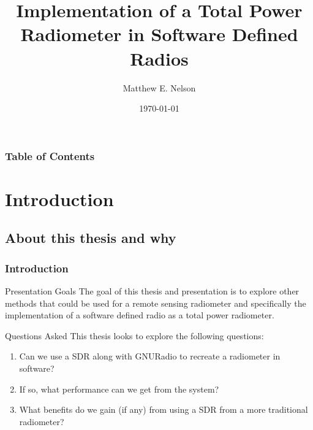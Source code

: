 \documentclass{beamer}
\title[SDR Radiometer]{Implementation of a Total Power Radiometer in Software Defined Radios}
\author{Matthew E. Nelson}
\institute[ISU] 
{
Iowa State University \\ 
\medskip
\textit{mnelson@iastate.edu} %
}
\date{\today}
\begin{document}
\begin{frame}
\titlepage 
\end{frame}

\begin{frame}[allowframebreaks]
\frametitle{Table of Contents} 
\begin{multicols}{2}
\tableofcontents[hideallsubsections]
\end{multicols}
\end{frame}


\section{Introduction} 
\subsection{About this thesis and why}
\begin{frame}
\frametitle{Introduction}
\begin{block}{Presentation Goals}
The goal of this thesis and presentation is to explore other methods that could be used for a remote sensing radiometer and specifically the implementation of a software defined radio as a total power radiometer.
\end{block}
\pause

\begin{block}{Questions Asked}
This thesis looks to explore the following questions: 
\begin{enumerate}
\item Can we use a SDR along with GNURadio to recreate a radiometer in software?
\item If so, what performance can we get from the system?
\item What benefits do we gain (if any) from using a SDR from a more traditional radiometer?
\end{enumerate}
\end{block}
\end{frame} 
\end{document}
